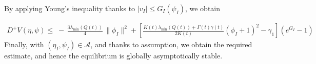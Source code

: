 \documentclass[10pt, a4paper]{amsart}
\makeatletter
\newcounter{assu}
\theoremstyle{plain}
\theoremstyle{definition}
\theoremstyle{remark}
\renewenvironment{proof}[1][\proofname]{\par
  \pushQED{\qed}%
  \normalfont \topsep6\p@\@plus6\p@\relax
  \trivlist
  \item[\hskip\labelsep
        \itshape
    #1\ \ref{#1}.]\ignorespaces
}{%
  \popQED\endtrivlist\@endpefalse
}
\numberwithin{equation}{section}
\makeatother
\begin{document}
\begin{proof}[of Theorem \ref{th3.8}]


By applying Young’s inequality  thanks to $\vert v_I\vert\leq G_I(\psi_I)$, we obtain






\begin{align}\label{e3.97}
    D^{+}V(\eta,\psi)
\le\;
 -\,\frac{3\lambda_{\min}(Q(t))}{4}\,\|\phi_I\|^{2}+\left[\frac{K(t)\lambda_{\min}(Q(t))+\Gamma(t)\gamma(t)}{2K(t)}(\phi_I+1)^2-\gamma_1\right](e^{G_I}-1)
\end{align}
 Finally, with $(\eta_I,\psi_I)\in\mathcal{A}$, and thanks to assumption, we obtain the required estimate, and hence the equilibrium is globally asymptotically stable. %
\end{proof}
\end{document}

